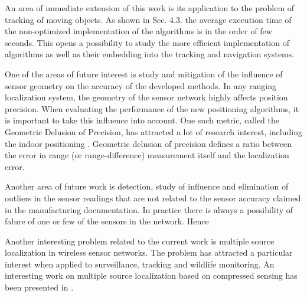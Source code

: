An area of immediate extension of this work is its application to the problem of tracking of moving objects. As shown in Sec. 4.3. the average execution time of the non-optimized implementation of the algorithms is in the order of few seconds. This opens a possibility to study the more efficient implementation of algorithms as well as their embedding into the tracking and navigation systems.

One of the areas of future interest is study and mitigation of the influence of sensor geometry on the accuracy of the developed methods. In any ranging localization system, the geometry of the sensor network  highly affects position precision.   When evaluating the performance of the new positioning algorithms, it is important to  take this influence into account. One such metric, called the Geometric Delusion of Precision, has attracted a lot of research interest, including the indoor positioning \cite{Sharp, Sharp2}. Geometric delusion of precision defines a ratio between the error in range (or range-difference) measurement itself and the localization error.

Another area of future work is detection, study of influence and elimination of outliers in the sensor readings that are not related to the sensor accuracy claimed in the manufacturing documentation. In practice there is always a possibility of falure of one or few of the sensors in the network. Hence

Another interesting problem related to the current work is multiple source localization in wireless sensor networks. The problem has attracted a particular interest when applied to surveillance, tracking and wildlife monitoring. An interesting work on multiple source localization based on compressed sensing has been presented in \cite{LiuCS, LinCai}.



